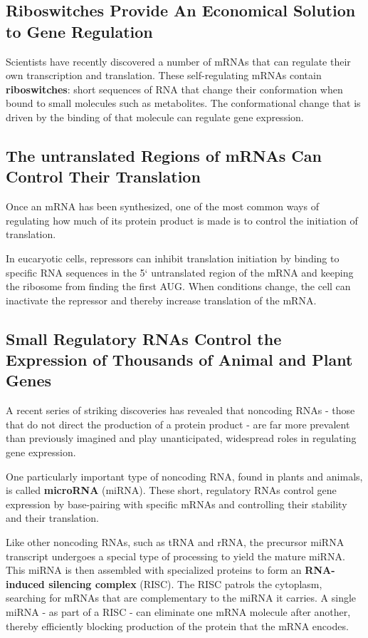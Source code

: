 \subsection{Riboswitches Provide An Economical Solution to Gene Regulation}

Scientists have recently discovered a number of mRNAs that can regulate their
own transcription and translation. These self-regulating mRNAs contain
\textbf{riboswitches}: short sequences of RNA that change their conformation
when bound to small molecules such as metabolites.
The conformational change that is driven by the binding of that molecule
can regulate gene expression.

\subsection{The untranslated Regions of mRNAs Can Control Their Translation}

Once an mRNA has been synthesized, one of the most common ways of
regulating how much of its protein product is made is to control the initiation of translation.

In eucaryotic cells, repressors can inhibit translation initiation by binding
to specific RNA sequences in the 5` untranslated region of the mRNA
and keeping the ribosome from finding the first AUG. When conditions
change, the cell can inactivate the repressor and thereby increase translation of the mRNA.

\subsection{Small Regulatory RNAs Control the Expression of Thousands of Animal and Plant Genes}

A recent series of striking discoveries has revealed
that noncoding RNAs - those that do not direct the production of a protein
product - are far more prevalent than previously imagined and play
unanticipated, widespread roles in regulating gene expression.

One particularly important type of noncoding RNA, found in plants and
animals, is called \textbf{microRNA} (miRNA). These short, regulatory RNAs control
gene expression by base-pairing with specific mRNAs and controlling
their stability and their translation.

Like other noncoding RNAs, such as tRNA and rRNA, the precursor
miRNA transcript undergoes a special type of processing to yield the
mature miRNA. This miRNA is then assembled with specialized proteins
to form an \textbf{RNA-induced silencing complex} (RISC). The RISC patrols the
cytoplasm, searching for mRNAs that are complementary to the miRNA
it carries. A single miRNA - as part of a RISC -
can eliminate one mRNA molecule after another, thereby efficiently
blocking production of the protein that the mRNA encodes.

